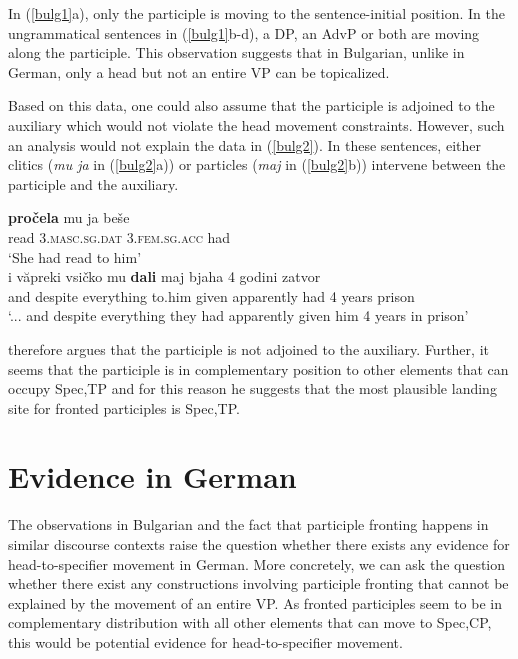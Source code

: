 \documentclass[letterpaper,parskip=half]{scrartcl}
\begin{document}
In (\ref{bulg1}a), only the participle is moving to the sentence-initial position. In the ungrammatical sentences in (\ref{bulg1}b-d), a DP, an AdvP or both are moving along the participle. This observation suggests that in Bulgarian, unlike in German, only a head but not an entire VP can be topicalized.

Based on this data, one could also assume that the participle is adjoined to the auxiliary which would not violate the head movement constraints. However, such an analysis would not explain the data in (\ref{bulg2}). In these sentences, either clitics (\textit{mu ja} in (\ref{bulg2}a)) or particles (\textit{maj} in (\ref{bulg2}b)) intervene between the participle and the auxiliary. 

\begin{exe}
\ex \label{bulg2} \begin{xlist}
\ex \gll \textbf{pročela} mu ja beše \\
read \textsc{3.masc.sg.dat} \textsc{3.fem.sg.acc} had \\
`She had read to him'\\
\citep{franks2008}
\ex \gll {[...]} i văpreki vsičko mu \textbf{dali} maj bjaha 4 godini zatvor \\
{} and despite everything to.him given apparently had 4 years prison \\
`... and despite everything they had apparently given him 4 years in prison' \\
\citep{harizanov2015head}
\end{xlist}
\end{exe}

\citet{harizanov2015head} therefore argues that the participle is not adjoined to the auxiliary. Further, it seems that the participle is in complementary position to other elements that can occupy Spec,TP and for this reason he suggests that the most plausible landing site for fronted participles is Spec,TP.


\section{Evidence in German}

The observations in Bulgarian and the fact that participle fronting happens in similar discourse contexts raise the question whether there exists any evidence for head-to-specifier movement in German. More concretely, we can ask the question whether there exist any constructions involving participle fronting that cannot be explained by the movement of an entire VP.  As fronted participles seem to be in complementary distribution with all other elements that can move to Spec,CP, this would be potential evidence for head-to-specifier movement.
\end{document}
